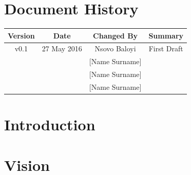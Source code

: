 \documentclass[a4paper,12pt]{article}
\begin{document}
	\newpage
	
	\tableofcontents
	\newpage
	\section*{Document History}
	
	\begin{table}[h!]
		
		\centering %
		\begin{tabular}{c c c c} %
			\hline\hline %
			Version & Date & Changed By & Summary \\ [0.5ex] %
			\hline %
			v0.1 & 27 May 2016 & Nsovo Baloyi & First Draft 
			\\ & & [Name Surname] &  
			\\ & & [Name Surname] &
			\\ & & [Name Surname] & \\ [1ex] 
			\hline
		\end{tabular}
		\label{table:nonlin} %
	\end{table}

	\newpage
	
	\section{Introduction}	
	
	
	\section{Vision}
		
	
	
\end{document}
